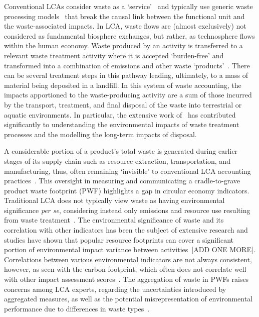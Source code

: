 Conventional LCAs consider waste as a `service'~\citep{guinee2021wasteisnotaservice} and typically use generic waste processing models~\citep{beylot2018} that break the causal link between the functional unit and the waste-associated impacts. In LCA, waste flows are (almost exclusively) not considered as fundamental biosphere exchanges, but rather, as technosphere flows within the human economy. Waste produced by an activity is transferred to a relevant waste treatment activity where it is accepted `burden-free' and transformed into a combination of emissions and other waste `products'~\citep{guinee2021wasteisnotaservice}. There can be several treatment steps in this pathway leading, ultimately, to a mass of material being deposited in a landfill. In this system of waste accounting, the impacts apportioned to the waste-producing activity are a sum of those incurred by the transport, treatment, and final disposal of the waste into terrestrial or aquatic environments. In particular, the extensive work of~\cite{doka2024publications} has contributed significantly to understanding the environmental impacts of waste treatment processes and the modelling the long-term impacts of disposal.

A considerable portion of a product's total waste is generated during earlier stages of its supply chain such as resource extraction, transportation, and manufacturing, thus, often remaining `invisible' to conventional LCA accounting practices~\citep{laurenti2016wastefootprint}. This oversight in measuring and communicating a cradle-to-grave product waste footprint (PWF) highlights a gap in circular economy indicators. Traditional LCA does not typically view waste as having environmental significance \textit{per se}, considering instead only emissions and resource use resulting from waste treatment~\cite{bisinella2024wastelca, laurenti2023wastefootprint}. The environmental significance of waste and its correlation with other indicators has been the subject of extensive research and studies have shown that popular resource footprints can cover a significant portion of environmental impact variance between activities~\citep{steinmann2017resourcefootprints}[ADD ONE MORE]. Correlations between various environmental indicators are not always consistent, however, as seen with the carbon footprint, which often does not correlate well with other impact assessment scores~\citep{laurenti2012carbonfootprint}. The aggregation of waste in PWFs raises concerns among LCA experts, regarding the uncertainties introduced by aggregated measures, as well as the potential misrepresentation of environmental performance due to differences in waste types~\citep{chen2021methoduncertainty,huijbregts2010energyfootprint}.

